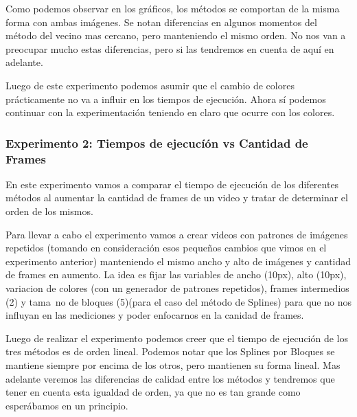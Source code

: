 \par Como podemos observar en los gr\'aficos, los m\'etodos se comportan de la misma forma con ambas im\'agenes. Se notan diferencias en algunos momentos del m\'etodo del vecino mas cercano, pero manteniendo el mismo orden. No nos van a preocupar mucho estas diferencias, pero si las tendremos en cuenta de aqu\'i en adelante.
\par Luego de este experimento podemos asumir que el cambio de colores pr\'acticamente no va a influir en los tiempos de ejecuci\'on. Ahora s\'i podemos continuar con la experimentaci\'on teniendo en claro que ocurre con los colores.


\subsubsection{Experimento 2: Tiempos de ejecucí\'on vs Cantidad de Frames}
\par En este experimento vamos a comparar el tiempo de ejecuci\'on de los diferentes m\'etodos al aumentar la cantidad de frames de un video y tratar de determinar el orden de los mismos.

\par Para llevar a cabo el experimento vamos a crear videos con patrones de im\'agenes repetidos (tomando en consideraci\'on esos pequeños cambios que vimos en el experimento anterior) manteniendo el mismo ancho y alto de im\'agenes y cantidad de frames en aumento. La idea es fijar las variables de ancho (10px), alto (10px), variacion de colores (con un generador de patrones repetidos), frames intermedios (2) y tama~no de bloques (5)(para el caso del m\'etodo de Splines) para que no nos influyan en las mediciones y poder enfocarnos en la canidad de frames.

\begin{figure}[ht]
	\begin{center}
	\end{center}
\end{figure}
\par Luego de realizar el experimento podemos creer que el tiempo de ejecuci\'on de los tres m\'etodos es de orden lineal. Podemos notar que los Splines por Bloques se mantiene siempre por encima de los otros, pero mantienen su forma lineal. Mas adelante veremos las diferencias de calidad entre los m\'etodos y tendremos que tener en cuenta esta igualdad de orden, ya que no es tan grande como esper\'abamos en un principio. 


